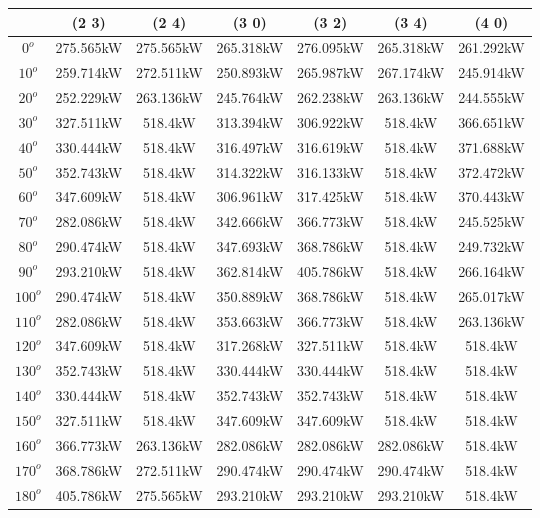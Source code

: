         \begin{table}[H]
        	\centering
        	\begin{tabular}{|c|c|c|c|c|c|c|} \hline
        			& (2 3)		& (2 4)		& (3 0)		& (3 2)		& (3 4)		& (4 0)		\\ \hline
		$0^o$	& 275.565kW	& 275.565kW	& 265.318kW	& 276.095kW	& 265.318kW	& 261.292kW	\\ \hline
		$10^o$	& 259.714kW	& 272.511kW	& 250.893kW	& 265.987kW	& 267.174kW	& 245.914kW	\\ \hline
		$20^o$	& 252.229kW	& 263.136kW	& 245.764kW	& 262.238kW	& 263.136kW	& 244.555kW	\\ \hline
		$30^o$	& 327.511kW	& 518.4kW	& 313.394kW	& 306.922kW	& 518.4kW	& 366.651kW	\\ \hline
		$40^o$	& 330.444kW	& 518.4kW	& 316.497kW	& 316.619kW	& 518.4kW	& 371.688kW	\\ \hline
		$50^o$	& 352.743kW	& 518.4kW	& 314.322kW	& 316.133kW	& 518.4kW	& 372.472kW	\\ \hline
		$60^o$	& 347.609kW	& 518.4kW	& 306.961kW	& 317.425kW	& 518.4kW	& 370.443kW	\\ \hline
		$70^o$	& 282.086kW	& 518.4kW	& 342.666kW	& 366.773kW	& 518.4kW	& 245.525kW	\\ \hline
		$80^o$	& 290.474kW	& 518.4kW	& 347.693kW	& 368.786kW	& 518.4kW	& 249.732kW	\\ \hline
		$90^o$	& 293.210kW	& 518.4kW	& 362.814kW	& 405.786kW	& 518.4kW	& 266.164kW	\\ \hline
		$100^o$	& 290.474kW	& 518.4kW	& 350.889kW	& 368.786kW	& 518.4kW	& 265.017kW	\\ \hline
		$110^o$	& 282.086kW	& 518.4kW	& 353.663kW	& 366.773kW	& 518.4kW	& 263.136kW	\\ \hline
		$120^o$	& 347.609kW	& 518.4kW	& 317.268kW	& 327.511kW	& 518.4kW	& 518.4kW	\\ \hline
		$130^o$	& 352.743kW	& 518.4kW	& 330.444kW	& 330.444kW	& 518.4kW	& 518.4kW	\\ \hline
		$140^o$	& 330.444kW	& 518.4kW	& 352.743kW	& 352.743kW	& 518.4kW	& 518.4kW	\\ \hline
		$150^o$	& 327.511kW	& 518.4kW	& 347.609kW	& 347.609kW	& 518.4kW	& 518.4kW	\\ \hline
		$160^o$	& 366.773kW	& 263.136kW	& 282.086kW	& 282.086kW	& 282.086kW	& 518.4kW	\\ \hline
		$170^o$	& 368.786kW	& 272.511kW	& 290.474kW	& 290.474kW	& 290.474kW	& 518.4kW	\\ \hline
		$180^o$	& 405.786kW	& 275.565kW	& 293.210kW	& 293.210kW	& 293.210kW	& 518.4kW	\\ \hline

\end{tabular}
\end{table}
